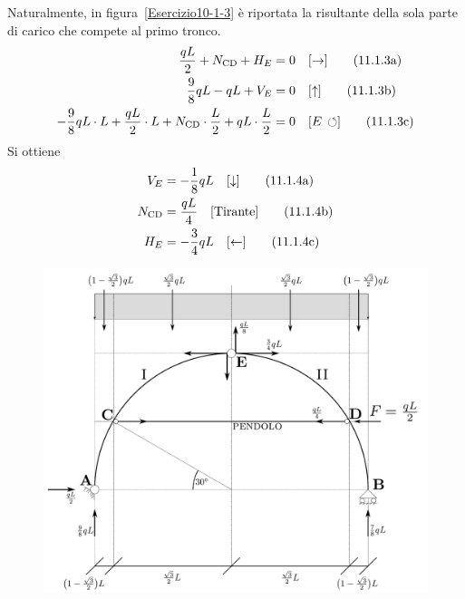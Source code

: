 Naturalmente, in figura~\ref{Esercizio10-1-3} è riportata la risultante della sola parte di carico che compete al primo tronco.
\begin{subequations}
\begin{align}
\frac{qL}{2} + N_{\textup{CD}} + H_{E} &= 0 \quad [\rightarrow] \label{equazione11-1-3a} \tag{11.1.3a} \\
\frac{9}{8}qL - qL + V_{E} &= 0                  \quad [\uparrow] \label{equazione11-1-3b} \tag{11.1.3b} \\ 
-\frac{9}{8}qL\cdot L + \frac{qL}{2}\cdot L + N_{\textup{CD}} \cdot \frac{L}{2} + qL\cdot \frac{L}{2} &=0 \quad [E\, \circlearrowleft] \label{equazione11-1-3c} \tag{11.1.3c}
\end{align}
\end{subequations}
Si ottiene 
\begin{subequations}
\begin{align}
V_{E} &= - \frac{1}{8}qL \quad [\downarrow] \label{equazione11-1-4a} \tag{11.1.4a} \\
N_{\textup{CD}} &= \frac{qL}{4}                \quad [\text{Tirante}] \label{equazione11-1-4b} \tag{11.1.4b} \\ 
H_{E} &= - \frac{3}{4}qL \quad [\leftarrow] \label{equazione11-1-4c} \tag{11.1.4c}
\end{align}
\end{subequations}
\renewcommand{\thefigure}{11.1~-~4}
\begin{figure}[ht]
\centering
\includegraphics[width=\textwidth]{Immagini/Parte_11/Esercizio11_1_1/esercizio11_1_4.pdf}
\caption{}
\label{Esercizio11-1-4}
\end{figure}

